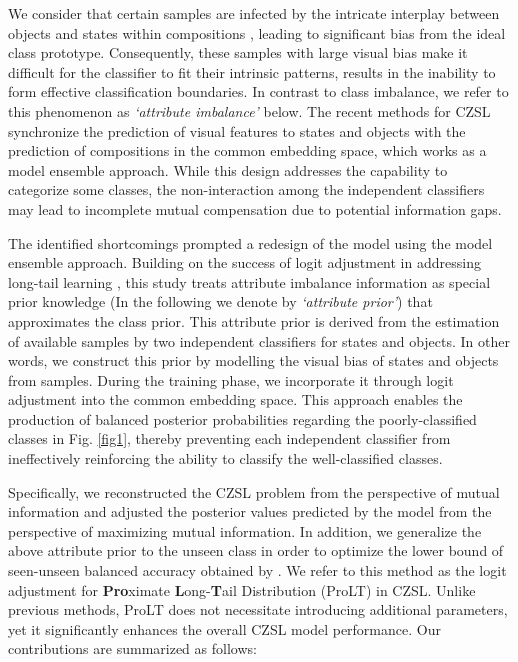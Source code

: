 \documentclass[letterpaper]{article} %
\theoremstyle{definition}
\begin{document}
We consider that certain samples are infected by the intricate interplay between objects and states within compositions \cite{atzmon2020causal}, leading to significant bias from the ideal class prototype. Consequently, these samples with large visual bias make it difficult for the classifier to fit their intrinsic patterns, results in the inability to form effective classification boundaries. In contrast to class imbalance, we refer to this phenomenon as \textit{`attribute imbalance'} below. The recent methods for CZSL \cite{saini2022disentangling,wang2023learning} synchronize the prediction of visual features to states and objects with the prediction of compositions in the common embedding space, which works as a model ensemble approach. While this design addresses the capability to categorize some classes, the non-interaction among the independent classifiers may lead to incomplete mutual compensation due to potential information gaps.


The identified shortcomings prompted a redesign of the model using the model ensemble approach. Building on the success of logit adjustment in addressing long-tail learning \cite{menon2020long}, this study treats attribute imbalance information as special prior knowledge (In the following we denote by \textit{`attribute prior'}) that approximates the class prior. This attribute prior is derived from the estimation of available samples by two independent classifiers for states and objects. In other words, we construct this prior by modelling the visual bias of states and objects from samples. During the training phase, we incorporate it through logit adjustment into the common embedding space. This approach enables the production of balanced posterior probabilities regarding the poorly-classified classes in Fig. \ref{fig1}, thereby preventing each independent classifier from ineffectively reinforcing the ability to classify the well-classified classes.


Specifically, we reconstructed the CZSL problem from the perspective of mutual information and adjusted the posterior values predicted by the model from the perspective of maximizing mutual information. In addition, we generalize the above attribute prior to the unseen class in order to optimize the lower bound of seen-unseen balanced accuracy \cite{xian2017zero} obtained by \citet{chen2022zero}. We refer to this method as the logit adjustment for \textbf{Pro}ximate \textbf{L}ong-\textbf{T}ail Distribution (ProLT) in CZSL. Unlike previous methods, ProLT does not necessitate introducing additional parameters, yet it significantly enhances the overall CZSL model performance. Our contributions are summarized as follows:
\end{document}
